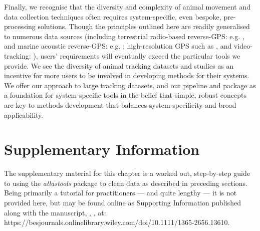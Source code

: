 Finally, we recognise that the diversity and complexity of animal movement and data collection techniques often requires system-specific, even bespoke, pre-processing solutions.
Though the principles outlined here are readily generalised to numerous data sources (including terrestrial radio-based reverse-GPS: e.g. \citealt{toledo2020}, and marine acoustic reverse-GPS: e.g. \citealt{aspillaga2021}; high-resolution GPS such as \citealt{strandburg-peshkin2015}, and video-tracking: \citealt{rathore2020}), users' requirements will eventually exceed the particular tools we provide.
We see the diversity of animal tracking datasets and studies as an incentive for more users to be involved in developing methods for their systems.
We offer our approach to large tracking datasets, and our pipeline and package as a foundation for system-specific tools in the belief that simple, robust concepts are key to methods development that balances system-specificity and broad applicability.

{ \begin{center}  \end{center} }


\newpage

\begingroup

\let\clearpage\relax
\let\cleardoublepage\relax
\let\cleardoublepage\relax

{\chapter*{Supplementary Information}}

The supplementary material for this chapter is a worked out, step-by-step guide to using the \emph{atlastools} package to clean data as described in preceding sections.
Being primarily a tutorial for practitioners --- and quite lengthy --- it is not provided here, but may be found online as Supporting Information published along with the manuscript, \textcite{gupte2022d}, , at:
https://besjournals.onlinelibrary.wiley.com/doi/10.1111/1365-2656.13610.

{ \begin{center}  \end{center} }

\endgroup

